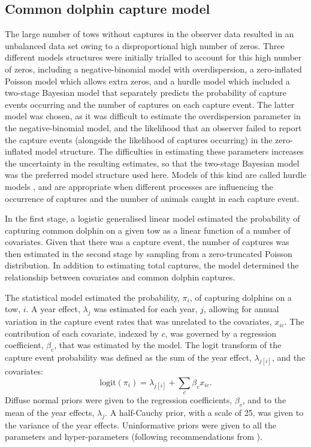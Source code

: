 \documentclass[10pt]{article}
\begin{document}
\subsection*{Common dolphin capture model}
The large number of tows without captures in the observer data resulted in an unbalanced data set owing to a disproportional high number of zeros. Three different models structures were initially trialled to account for this high number of zeros, including a negative-binomial model with overdispersion, a zero-inflated Poisson model which allows extra zeros, and a hurdle model which included a two-stage Bayesian model that separately predicts the probability of capture events occurring and the number of captures on each capture event.  The latter model was chosen, as it was difficult to estimate the overdispersion parameter in the negative-binomial model, and the likelihood that an observer failed to report the capture events (alongside the likelihood of captures occurring) in the zero-inflated model structure.  The difficulties in estimating these parameters increases the uncertainty in the resulting estimates, so that the two-stage Bayesian model was the preferred model structure used here. Models of this kind are called hurdle models \cite{mullahy_specification_1986, ridout_models_1998}, and are appropriate when different processes are influencing the occurrence of captures and the number of animals caught in each capture event.   

In the first stage, a logistic generalised linear
model estimated the probability of capturing common dolphin on a given
tow as a linear function of a number of covariates. Given that there
was a capture event, the number of captures was then estimated in the second
stage by sampling from a zero-truncated Poisson distribution. In
addition to estimating total captures, the model determined 
the relationship between covariates and common dolphin captures.

The statistical model estimated the probability, $\pi_i$, of
capturing dolphins on a tow, $i$.   A year effect, $\lambda_j$ was estimated
for each year, $j$, allowing for annual variation in the
capture event rates that was unrelated to the covariates, $x_{ic}$.  
The contribution of each covariate, indexed by $c$, was
governed by a regression coefficient, $\beta_c$, that was estimated by the
model.  The logit transform of the capture event probability was defined as the sum of the
year effect, $\lambda_{j[i]}$, and the covariates: 
\begin{equation}
 \textrm{logit}(\pi_i) =  \lambda_{j[i]} + \sum_c \beta_c x_{ic}.
\label{eq:logit_pi}
\end{equation}
Diffuse normal priors were given to the regression coefficients, $\beta_c$, and
to the mean of the year effects, $\lambda_j$.  
A half-Cauchy prior, with a
scale of 25, was given to the variance of the year effects. Uninformative priors were given to all the parameters and hyper-parameters (following recommendations from \cite{gelman_prior_2006}).
\end{document}
